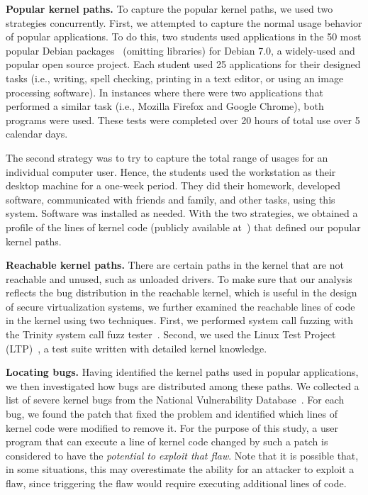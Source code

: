 \textbf{Popular kernel paths.}
To capture the popular kernel paths, we used two strategies concurrently.
First, we attempted to capture the normal usage behavior of popular applications.
To do this, two students used applications in the 50 most popular Debian
packages~\cite{Top-Packages} (omitting libraries) for Debian 7.0, a widely-used and
popular open source project.
Each student used 25 applications for their designed
tasks (i.e., writing, spell checking, printing in a text editor, or using 
an image processing software). In instances where there were two applications that performed a
similar task (i.e., Mozilla Firefox and Google Chrome), both programs were
used. These tests were completed over 20 hours of
total use over 5 calendar days.

The second strategy was to try to capture the total range of usages for an
individual computer user. Hence, the students used the workstation as their
desktop machine for a one-week period. They did their homework, developed
software, communicated with friends and family, and other tasks, using this system.
Software was installed as needed.
%
With the two strategies, we obtained a profile of the lines of
kernel code (publicly available at~\cite{Lind}) that defined our
popular kernel paths.

\textbf{Reachable kernel paths.}
There are certain paths in the kernel that are not reachable and unused, 
such as unloaded drivers. 
To make sure that our analysis reflects the bug distribution in the reachable kernel, 
which is useful in the design of secure virtualization systems, 
we further examined the reachable lines of
code in the kernel using two techniques. First,
we performed system call fuzzing with the Trinity
system call fuzz tester~\cite{Trinity}.
Second, we used the Linux Test Project (LTP)~\cite{LTP}, a test suite written
with detailed kernel knowledge.
%

\textbf{Locating bugs.}
Having identified the kernel paths used in popular applications,
we then investigated how bugs are distributed among these paths. We collected a list of
severe kernel bugs from the National Vulnerability Database~\cite{NVD}.
For each bug, we found the patch that fixed the problem and identified
which lines of kernel code were modified to remove it.
For the purpose of this study, a user program that can execute a line of kernel
code changed by such a patch is considered to have the \textit{potential to
exploit that flaw}.  Note that it is possible that, in some situations, this may
overestimate the ability for an attacker to exploit a flaw, since triggering the
flaw would require executing additional lines of code.

